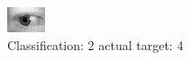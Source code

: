 \begin{figure}[h!]
\begin{center}
\includegraphics[width=0.60\columnwidth]{figures/ID800_class_2_target_4.png}
\end{center}
\caption{ Classification: 2 actual target: 4}
\label{fig:ID800_class_2_target_4}
\end{figure}
